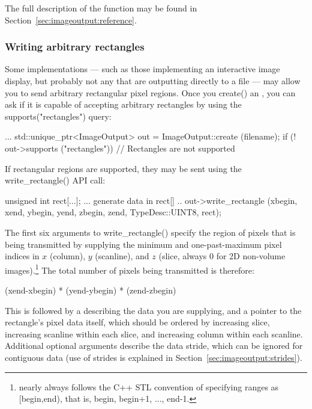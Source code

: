 The full description of the \writetile function may be found
in Section~\ref{sec:imageoutput:reference}.

\subsubsection{Writing arbitrary rectangles}

Some \ImageOutput implementations --- such as those implementing an
interactive image display, but probably not any that are outputting
directly to a file --- may allow you to send arbitrary rectangular pixel
regions.  Once you {\kw create()} an \ImageOutput, you can ask if it is
capable of accepting arbitrary rectangles by using the {\kw
supports("rectangles")} query:

\begin{code}
        ...
        std::unique_ptr<ImageOutput> out = ImageOutput::create (filename);
        if (! out->supports ("rectangles")) {
            // Rectangles are not supported
        }
\end{code}

If rectangular regions are supported, they may be sent using
the {\kw write_rectangle()} API call:

\begin{code}
        unsigned int rect[...];
        ... generate data in rect[] ..
        out->write_rectangle (xbegin, xend, ybegin, yend, zbegin, zend,
                              TypeDesc::UINT8, rect);
\end{code}

The first six arguments to {\kw write_rectangle()} specify the region of
pixels that is being transmitted by supplying the minimum and one-past-maximum
pixel indices in $x$ (column), $y$ (scanline), and $z$ (slice, always 0
for 2D non-volume images).\footnote{\OpenImageIO nearly always follows
the C++ STL convention of specifying ranges as {\cf [begin,end)}, that
is, {\cf begin, begin+1, ..., end-1.}}
The total number of pixels being transmitted is therefore:
\begin{code}
        (xend-xbegin) * (yend-ybegin) * (zend-zbegin)
\end{code}
\noindent This is followed by a \TypeDesc describing the data you
are supplying, and a pointer to the rectangle's pixel data itself, which
should be ordered by increasing slice, increasing scanline within each
slice, and increasing column within each scanline.  Additional optional
arguments describe the data stride, which can be ignored for contiguous
data (use of strides is explained in
Section~\ref{sec:imageoutput:strides}).


